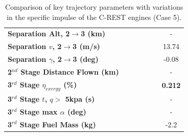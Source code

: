 \begin{table}[ht!]
\begin{tabular}{l c c c c c c}
		\textbf{Separation Alt, 2$\rightarrow$3 (km)}
		& \secondthirdSeparationAltIspNinetyNoReturn
		& \secondthirdSeparationAltIspNinetyFiveNoReturn
		& \secondthirdSeparationAltIspStandardNoReturn
		& \secondthirdSeparationAltIspOneHundredFiveNoReturn
		& \secondthirdSeparationAltIspOneHundredTenNoReturn
		& -
		\\
		\textbf{Separation $v$, 2$\rightarrow$3 (m/s)}
		& \secondthirdSeparationvIspNinetyNoReturn
		& \secondthirdSeparationvIspNinetyFiveNoReturn
		& \secondthirdSeparationvIspStandardNoReturn
		& \secondthirdSeparationvIspOneHundredFiveNoReturn
		& \secondthirdSeparationvIspOneHundredTenNoReturn
		&13.74
		\\
		\textbf{Separation $\gamma$, 2$\rightarrow$3 (deg)}
		& \secondthirdSeparationgammaIspNinetyNoReturn
		& \secondthirdSeparationgammaIspNinetyFiveNoReturn
		& \secondthirdSeparationgammaIspStandardNoReturn
		& \secondthirdSeparationgammaIspOneHundredFiveNoReturn
		& \secondthirdSeparationgammaIspOneHundredTenNoReturn
		&-0.08
		\\
	
		\textbf{2$^{nd}$ Stage Distance Flown (km)}
		& \SecondDistIspNinetyNoReturn
		& \SecondDistIspNinetyFiveNoReturn
		& \SecondDistIspStandardNoReturn
		& \SecondDistIspOneHundredFiveNoReturn
		& \SecondDistIspOneHundredTenNoReturn
		& -
		\\
		\hline 
		\textbf{3$^{rd}$ Stage $\eta_{exergy}$ (\%)}
		& \textbf{\thirddExergyEffIspNinetyNoReturn}
		& \textbf{\thirddExergyEffIspNinetyFiveNoReturn}
		& \textbf{\thirddExergyEffIspStandardNoReturn}
		& \textbf{\thirddExergyEffIspOneHundredFiveNoReturn}
		& \textbf{\thirddExergyEffIspOneHundredTenNoReturn}
		& \textbf{0.212}
		\\

		\textbf{3$^{rd}$ Stage $t$, $q >$ 5kpa (s)}
		& \thirdqOverFiveIspNinetyNoReturn
		& \thirdqOverFiveIspNinetyFiveNoReturn
		& \thirdqOverFiveIspStandardNoReturn
		& \thirdqOverFiveIspOneHundredFiveNoReturn
		& \thirdqOverFiveIspOneHundredTenNoReturn
		& -
		\\
		\textbf{3$^{rd}$ Stage max $\alpha$ (deg)}
		& \thirdmaxAoAIspNinetyNoReturn
		& \thirdmaxAoAIspNinetyFiveNoReturn
		& \thirdmaxAoAIspStandardNoReturn
		& \thirdmaxAoAIspOneHundredFiveNoReturn
		& \thirdmaxAoAIspOneHundredTenNoReturn
		& -
		\\
		\textbf{3$^{rd}$ Stage Fuel Mass (kg)}
		& \thirdmFuelIspNinetyNoReturn
		& \thirdmFuelIspNinetyFiveNoReturn
		& \thirdmFuelIspStandardNoReturn
		& \thirdmFuelIspOneHundredFiveNoReturn
		& \thirdmFuelIspOneHundredTenNoReturn
		&-2.2
		\\
		\hline 
	\end{tabular} 
	
	\caption{Comparison of key trajectory parameters with variations in the specific impulse of the C-REST engines (Case 5).}
	\label{tab:comparison30}
\end{table}


